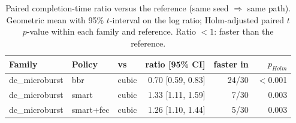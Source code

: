 \begin{table}[t]\centering\footnotesize
\caption{Paired completion-time ratio versus the reference (same seed $\Rightarrow$ same path). Geometric mean with 95\% $t$-interval on the log ratio; Holm-adjusted paired $t$ $p$-value within each family and reference. Ratio $<1$: faster than the reference.}
\label{tab:scalepaired}\begin{tabular}{lllrrr}\toprule
Family & Policy & vs & ratio [95\% CI] & faster in & $p_{Holm}$\\\midrule
dc\_microburst & bbr & cubic & 0.70 [0.59, 0.83] & 24/30 & $<$0.001 \\
dc\_microburst & smart & cubic & 1.33 [1.11, 1.59] & 7/30 & 0.003 \\
dc\_microburst & smart+fec & cubic & 1.26 [1.10, 1.44] & 5/30 & 0.003 \\
\bottomrule\end{tabular}\end{table}
